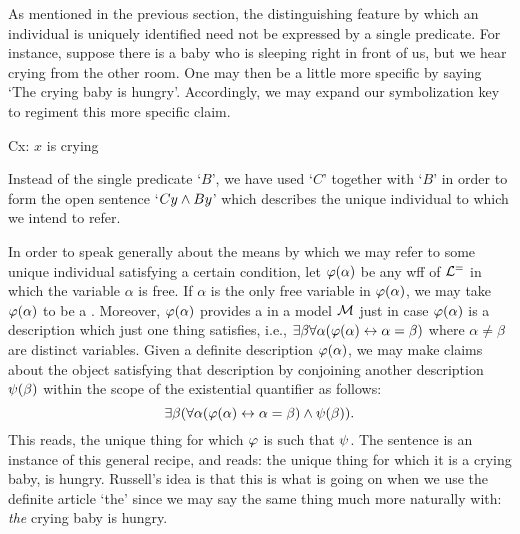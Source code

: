 As mentioned in the previous section, the distinguishing feature by which an individual is uniquely identified need not be expressed by a single predicate.
For instance, suppose there is a baby who is sleeping right in front of us, but we hear crying from the other room.
One may then be a little more specific by saying `The crying baby is hungry'.
Accordingly, we may expand our symbolization key to regiment this more specific claim.
\begin{multicols}{2}
  \begin{ekey}
    \item[Cx:] $x$ is crying
  \end{ekey}

  \columnbreak

  \begin{earg} \label{compbaby}
  \end{earg}
\end{multicols}
Instead of the single predicate `$B$', we have used `$C$' together with `$B$' in order to form the open sentence `$Cy \wedge By$' which describes the unique individual to which we intend to refer.

In order to speak generally about the means by which we may refer to some unique individual satisfying a certain condition, let $\varphi(\alpha)$ be any wff of $\mathcal{L}^{=}$ in which the variable $\alpha$ is free. 
If $\alpha$ is the only free variable in $\varphi(\alpha)$, we may take $\varphi(\alpha)$ to be a .
Moreover, $\varphi(\alpha)$ provides a  in a model $\mathcal{M}$ just in case $\varphi(\alpha)$ is a description which just one thing satisfies, i.e., $\exists \beta\forall \alpha(\varphi(\alpha)\leftrightarrow \alpha = \beta)$ where $\alpha \neq \beta$ are distinct variables.
Given a definite description $\varphi(\alpha)$, we may make claims about the object satisfying that description by conjoining another description $\psi(\beta)$ within the scope of the existential quantifier as follows: 
  $$\exists \beta(\forall \alpha(\varphi(\alpha)\leftrightarrow \alpha = \beta) \wedge \psi(\beta)).$$
This reads, the unique thing for which $\varphi$ is such that $\psi$.
The sentence  is an instance of this general recipe, and reads: the unique thing for which it is a crying baby, is hungry. 
Russell's idea is that this is what is going on when we use the definite article `the' since we may say the same thing much more naturally with: \textit{the} crying baby is hungry.

